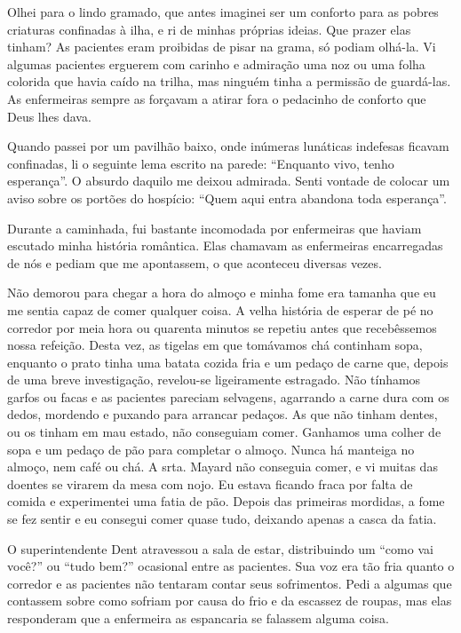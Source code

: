 Olhei para o lindo gramado, que antes imaginei ser um conforto para as
pobres criaturas confinadas à ilha, e ri de minhas próprias ideias. Que
prazer elas tinham? As pacientes eram proibidas de pisar na grama, só
podiam olhá-la. Vi algumas pacientes erguerem com carinho e admiração
uma noz ou uma folha colorida que havia caído na trilha, mas ninguém
tinha a permissão de guardá-las. As enfermeiras sempre as forçavam a
atirar fora o pedacinho de conforto que Deus lhes dava.

Quando
passei por um pavilhão baixo, onde inúmeras lunáticas indefesas ficavam
confinadas, li o seguinte lema escrito na parede: ``Enquanto vivo, tenho
esperança''. O absurdo daquilo me deixou admirada. Senti vontade de
colocar um aviso sobre os portões do hospício: ``Quem aqui entra
abandona toda esperança''.

Durante a caminhada, fui bastante incomodada por enfermeiras que haviam
escutado minha história romântica. Elas chamavam as enfermeiras
encarregadas de nós e pediam que me apontassem, o que aconteceu diversas
vezes.

Não demorou para chegar a hora do almoço e minha fome era tamanha que eu
me sentia capaz de comer qualquer coisa. A velha história de esperar de
pé no corredor por meia hora ou quarenta minutos se repetiu antes que
recebêssemos nossa refeição. Desta vez, as tigelas em que tomávamos chá
continham sopa, enquanto o prato tinha uma batata cozida fria e um
pedaço de carne que, depois de uma breve investigação, revelou-se
ligeiramente estragado. Não tínhamos garfos ou facas e as pacientes
pareciam selvagens, agarrando a carne dura com os dedos, mordendo e
puxando para arrancar pedaços. As que não tinham dentes, ou os tinham em
mau estado, não conseguiam comer. Ganhamos uma colher de sopa e um
pedaço de pão para completar o almoço. Nunca há manteiga no almoço, nem
café ou chá. A srta. Mayard não conseguia comer, e vi muitas das doentes
se virarem da mesa com nojo. Eu estava ficando fraca por falta de comida
e experimentei uma fatia de pão. Depois das primeiras mordidas, a fome
se fez sentir e eu consegui comer quase tudo, deixando apenas a casca da
fatia.

O superintendente Dent atravessou a sala de estar, distribuindo um
``como vai você?'' ou ``tudo bem?'' ocasional entre as pacientes. Sua
voz era tão fria quanto o corredor e as pacientes não tentaram contar
seus sofrimentos. Pedi a algumas que contassem sobre como sofriam por
causa do frio e da escassez de roupas, mas elas responderam que a
enfermeira as espancaria se falassem alguma coisa.

